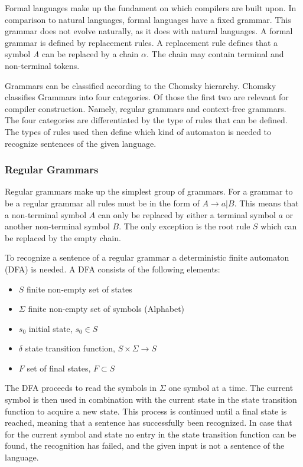 Formal languages make up the fundament on which compilers are built upon. In comparison to natural languages, formal languages have a fixed grammar. This grammar does not evolve naturally, as it does with natural languages. A formal grammar is defined by replacement rules. A replacement rule defines that a symbol \textit{A} can be replaced by a chain $\alpha$. The chain may contain terminal and non-terminal tokens. 

Grammars can be classified according to the Chomsky hierarchy. Chomsky classifies Grammars into four categories. Of those the first two are relevant for compiler construction. Namely, regular grammars and context-free grammars. The four categories are differentiated by the type of rules that can be defined. The types of rules used then define which kind of automaton is needed to recognize sentences of the given language. 

\subsubsection{Regular Grammars}

Regular grammars make up the simplest group of grammars. For a grammar to be a regular grammar all rules must be in the form of $A\rightarrow a | B$. This means that a non-terminal symbol $A$ can only be replaced by either a terminal symbol $a$ or another non-terminal symbol $B$. The only exception is the root rule $S$ which can be replaced by the empty chain. 

To recognize a sentence of a regular grammar a deterministic finite automaton (DFA) is needed. A DFA consists of the following elements:

\begin{itemize}
    \item $S$ finite non-empty set of states
    \item $\Sigma$ finite non-empty set of symbols (Alphabet)
    \item $s_0$ initial state, $s_0 \in S$
    \item $\delta$ state transition function, $S \times \Sigma \rightarrow S$
    \item $F$ set of final states, $F \subset S$
\end{itemize}

The DFA proceeds to read the symbols in $\Sigma$ one symbol at a time. The current symbol is then used in combination with the current state in the state transition function to acquire a new state. This process is continued until a final state is reached, meaning that a sentence has successfully been recognized. In case that for the current symbol and state no entry in the state transition function can be found, the recognition has failed, and the given input is not a sentence of the language. 

